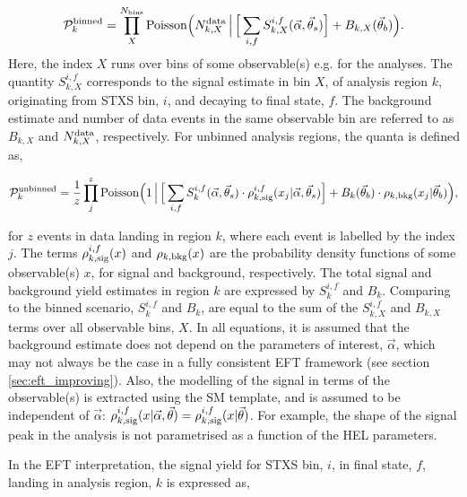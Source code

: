 \begin{equation}
    \mathcal{P}^{\rm{binned}}_k = \prod^{N_{\rm{bins}}}_X {\rm{Poisson}}\Big( N^{\rm{data}}_{k,X} \, \Big| \, \Big[\sum_{i,f} S^{i,f}_{k,X}(\vec{\alpha},\vec{\theta}_s) \Big] + B_{k,X}(\vec{\theta}_b) \Big).  
\end{equation}
\noindent
Here, the index $X$ runs over bins of some observable(s) e.g. \mgg for the \Hgg analyses. The quantity $S^{i,f}_{k,X}$ corresponds to the signal estimate in bin $X$, of analysis region $k$, originating from STXS bin, $i$, and decaying to final state, $f$. The background estimate and number of data events in the same observable bin are referred to as $B_{k,X}$ and $N^{\rm{data}}_{k,X}$, respectively. For unbinned analysis regions, the quanta is defined as,

\begin{equation}
    \mathcal{P}^{\rm{unbinned}}_k = \frac{1}{z} \prod^{z}_j {\rm{Poisson}}\Big(1 \, \Big| \, \Big[\sum_{i,f} S^{i,f}_{k}(\vec{\alpha},\vec{\theta}_s) \cdot \rho^{i,f}_{k,{\rm{sig}}}(x_j|\vec{\alpha},\vec{\theta}_s) \Big] + B_{k}(\vec{\theta}_b)\cdot \rho_{k,{\rm{bkg}}}(x_j|\vec{\theta}_b) \Big),
\end{equation}

\noindent
for $z$ events in data landing in region $k$, where each event is labelled by the index $j$. The terms $\rho^{i,f}_{k,{\rm{sig}}}(x)$ and $\rho_{k,{\rm{bkg}}}(x)$ are the probability density functions of some observable(s) $x$, for signal and background, respectively. The total signal and background yield estimates in region $k$ are expressed by $S^{i,f}_{k}$ and $B_{k}$. Comparing to the binned scenario, $S^{i,f}_{k}$ and $B_{k}$, are equal to the sum of the $S^{i,f}_{k,X}$ and $B_{k,X}$ terms over all observable bins, $X$. In all equations, it is assumed that the background estimate does not depend on the parameters of interest, $\vec{\alpha}$, which may not always be the case in a fully consistent EFT framework (see section \ref{sec:eft_improving}). Also, the modelling of the signal in terms of the observable(s) is extracted using the SM template, and is assumed to be independent of $\vec{\alpha}$: $\rho^{i,f}_{k,{\rm{sig}}}(x|\vec{\alpha},\vec{\theta})=\rho^{i,f}_{k,{\rm{sig}}}(x|\vec{\theta})$. For example, the shape of the signal \mgg peak in the \Hgg analysis is not parametrised as a function of the HEL parameters.

In the EFT interpretation, the signal yield for STXS bin, $i$, in final state, $f$, landing in analysis region, $k$ is expressed as, 

